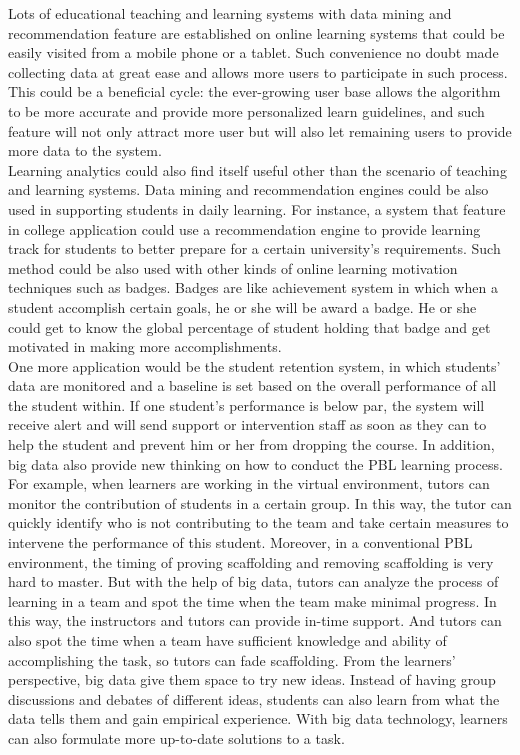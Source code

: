 \documentclass[sigconf]{acmart}
\begin{document}
Lots of educational teaching and learning systems with data mining and recommendation feature are established on online learning systems that could be easily visited from a mobile phone or a tablet. Such convenience no doubt made collecting data at great ease and allows more users to participate in such process. This could be a beneficial cycle: the ever-growing user base allows the algorithm to be more accurate and provide more personalized learn guidelines, and such feature will not only attract more user but will also let remaining users to provide more data to the system.\\
Learning analytics could also find itself useful other than the scenario of teaching and learning systems. Data mining and recommendation engines could be also used in supporting students in daily learning. For instance, a system that feature in college application could use a recommendation engine to provide learning track for students to better prepare for a certain university's requirements. Such method could be also used with other kinds of online learning motivation techniques such as badges. Badges are like achievement system in which when a student accomplish certain goals, he or she will be award a badge. He or she could get to know the global percentage of student holding that badge and get motivated in making more accomplishments\cite{lankshear2006}.\\
One more application would be the student retention system, in which students' data are monitored and a baseline is set based on the overall performance of all the student within. If one student's performance is below par, the system will receive alert and will send support or intervention staff as soon as they can to help the student and prevent him or her from dropping the course. In addition, big data also provide new thinking on how to conduct the PBL learning process. For example, when learners are working in the virtual environment, tutors can monitor the contribution of students in a certain group. In this way, the tutor can quickly identify who is not contributing to the team and take certain measures to intervene the performance of this student. Moreover, in a conventional PBL environment, the timing of proving scaffolding and removing scaffolding is very hard to master. But with the help of big data, tutors can analyze the process of learning in a team and spot the time when the team make minimal progress\cite{Kim2013}. In this way, the instructors and tutors can provide in-time support. And tutors can also spot the time when a team have sufficient knowledge and ability of accomplishing the task, so tutors can fade scaffolding. From the learners' perspective, big data give them space to try new ideas. Instead of having group discussions and debates of different ideas, students can also learn from what the data tells them and gain empirical experience. With big data technology, learners can also formulate more up-to-date solutions to a task\cite{Krumholz2014}.\\
\end{document}
